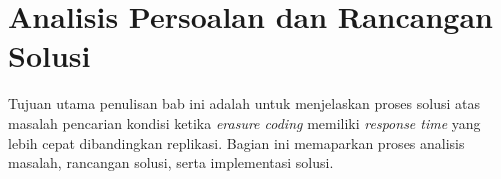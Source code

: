 \chapter{Analisis Persoalan dan Rancangan Solusi}
\label{chapter:analisis-persoalan-dan-rancangan-solusi}

Tujuan utama penulisan bab ini adalah untuk menjelaskan proses solusi atas masalah pencarian kondisi ketika \textit{erasure coding} memiliki \textit{response time} yang lebih cepat dibandingkan replikasi. Bagian ini memaparkan proses analisis masalah, rancangan solusi, serta implementasi solusi.


